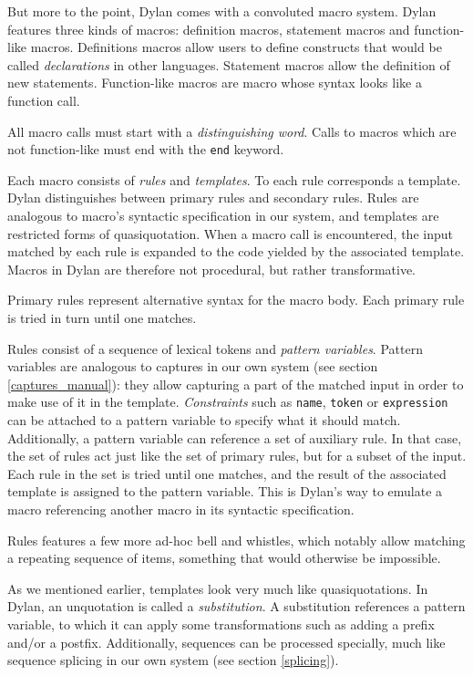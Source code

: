 But more to the point, Dylan comes with a convoluted macro system.
\cite{dylan_manual} Dylan features three kinds of macros: definition macros,
statement macros and function-like macros. Definitions macros allow users to
define constructs that would be called \emph{declarations} in other
languages. Statement macros allow the definition of new
statements. Function-like macros are macro whose syntax looks like a function
call.

All macro calls must start with a \emph{distinguishing word}. Calls to macros
which are not function-like must end with the \texttt{end} keyword.

Each macro consists of \emph{rules} and \emph{templates}. To each rule
corresponds a template. Dylan distinguishes between primary rules and secondary
rules. Rules are analogous to macro's syntactic specification in our system, and
templates are restricted forms of quasiquotation. When a macro call is
encountered, the input matched by each rule is expanded to the code yielded by
the associated template. Macros in Dylan are therefore not procedural, but
rather transformative.

Primary rules represent alternative syntax for the macro body. Each primary rule
is tried in turn until one matches.

Rules consist of a sequence of lexical tokens and \emph{pattern
  variables}. Pattern variables are analogous to captures in our own system (see
section \ref{captures_manual}): they allow capturing a part of the matched input
in order to make use of it in the template. \emph{Constraints} such as
\texttt{name}, \texttt{token} or \texttt{expression} can be attached to a
pattern variable to specify what it should match. Additionally, a pattern
variable can reference a set of auxiliary rule. In that case, the set of rules
act just like the set of primary rules, but for a subset of the input. Each rule
in the set is tried until one matches, and the result of the associated template
is assigned to the pattern variable.  This is Dylan's way to emulate a macro
referencing another macro in its syntactic specification.

Rules features a few more ad-hoc bell and whistles, which notably allow matching
a repeating sequence of items, something that would otherwise be impossible.

As we mentioned earlier, templates look very much like quasiquotations. In
Dylan, an unquotation is called a \emph{substitution}. A substitution references
a pattern variable, to which it can apply some transformations such as adding a
prefix and/or a postfix. Additionally, sequences can be processed specially,
much like sequence splicing in our own system (see section \ref{splicing}).

